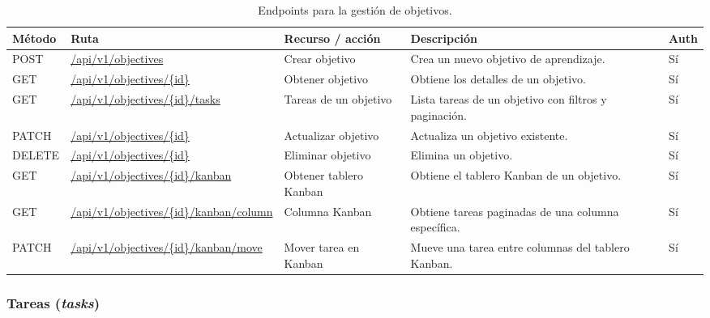 \begin{table}[H]
\centering
\footnotesize
\setlength{\tabcolsep}{4pt}
\renewcommand{\arraystretch}{1.25}
\begin{tabular}{|p{1.4cm}|p{4.1cm}|p{3.2cm}|p{5.8cm}|p{1cm}|}
\hline
\textbf{Método} & \textbf{Ruta} & \textbf{Recurso / acción} & \textbf{Descripción} & \textbf{Auth} \\
\hline

POST & \url{/api/v1/objectives} & Crear objetivo &
Crea un nuevo objetivo de aprendizaje. &
Sí \\
\hline

GET & \url{/api/v1/objectives/{id}} & Obtener objetivo &
Obtiene los detalles de un objetivo. &
Sí \\
\hline

GET & \url{/api/v1/objectives/{id}/tasks} & Tareas de un objetivo &
Lista tareas de un objetivo con filtros y paginación. &
Sí \\
\hline

PATCH & \url{/api/v1/objectives/{id}} & Actualizar objetivo &
Actualiza un objetivo existente. &
Sí \\
\hline

DELETE & \url{/api/v1/objectives/{id}} & Eliminar objetivo &
Elimina un objetivo. &
Sí \\
\hline

GET & \url{/api/v1/objectives/{id}/kanban} & Obtener tablero Kanban &
Obtiene el tablero Kanban de un objetivo. &
Sí \\
\hline

GET & \url{/api/v1/objectives/{id}/kanban/column} & Columna Kanban &
Obtiene tareas paginadas de una columna específica. &
Sí \\
\hline

PATCH & \url{/api/v1/objectives/{id}/kanban/move} & Mover tarea en Kanban &
Mueve una tarea entre columnas del tablero Kanban. &
Sí \\
\hline

\end{tabular}
\caption{Endpoints para la gestión de objetivos.}
\end{table}

\subsubsection*{Tareas (\textit{tasks})}

